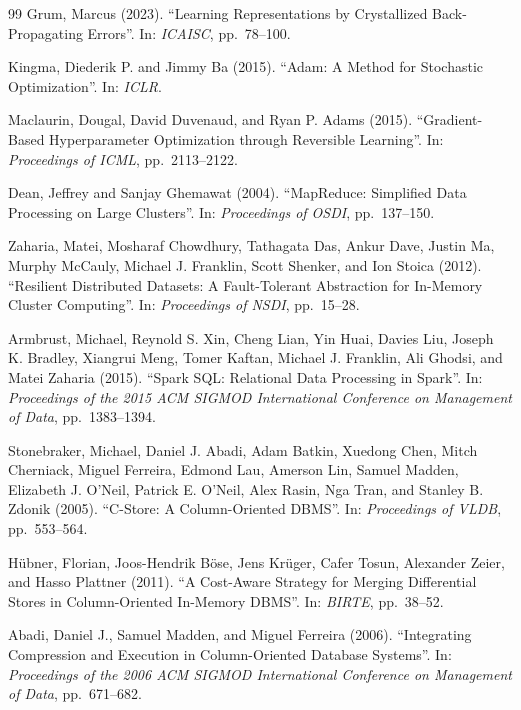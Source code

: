 \documentclass[12pt]{report}
\begin{document}
\begin{thebibliography}{99}
Grum, Marcus (2023).
``Learning Representations by Crystallized Back-Propagating Errors''.
In: \textit{ICAISC},
pp.~78--100.

Kingma, Diederik P. and Jimmy Ba (2015).
``Adam: A Method for Stochastic Optimization''.
In: \textit{ICLR}.

Maclaurin, Dougal, David Duvenaud,
and Ryan P. Adams (2015).
``Gradient-Based Hyperparameter Optimization through Reversible Learning''.
In: \textit{Proceedings of ICML},
pp.~2113--2122.


Dean, Jeffrey and Sanjay Ghemawat (2004).
``MapReduce: Simplified Data Processing on Large Clusters''.
In: \textit{Proceedings of OSDI},
pp.~137--150.

Zaharia, Matei, Mosharaf Chowdhury,
Tathagata Das, Ankur Dave,
Justin Ma, Murphy McCauly,
Michael J. Franklin, Scott Shenker,
and Ion Stoica (2012).
``Resilient Distributed Datasets: A Fault-Tolerant Abstraction for In-Memory Cluster Computing''.
In: \textit{Proceedings of NSDI},
pp.~15--28.


Armbrust, Michael, Reynold S. Xin, Cheng Lian, Yin Huai,
Davies Liu, Joseph K. Bradley, Xiangrui Meng,
Tomer Kaftan, Michael J. Franklin, Ali Ghodsi,
and Matei Zaharia (2015).
``Spark SQL: Relational Data Processing in Spark''.
In: \textit{Proceedings of the 2015 ACM SIGMOD International Conference on Management of Data},
pp.~1383--1394.

Stonebraker, Michael, Daniel J. Abadi,
Adam Batkin, Xuedong Chen,
Mitch Cherniack, Miguel Ferreira,
Edmond Lau, Amerson Lin,
Samuel Madden, Elizabeth J. O'Neil,
Patrick E. O'Neil, Alex Rasin,
Nga Tran, and Stanley B. Zdonik (2005).
``C-Store: A Column-Oriented DBMS''.
In: \textit{Proceedings of VLDB},
pp.~553--564.

H{\"u}bner, Florian, Joos-Hendrik B{\"o}se,
Jens Kr{\"u}ger, Cafer Tosun,
Alexander Zeier, and Hasso Plattner (2011).
``A Cost-Aware Strategy for Merging Differential Stores in Column-Oriented In-Memory DBMS''.
In: \textit{BIRTE},
pp.~38--52.


Abadi, Daniel J., Samuel Madden,
and Miguel Ferreira (2006).
``Integrating Compression and Execution in Column-Oriented Database Systems''.
In: \textit{Proceedings of the 2006 ACM SIGMOD International Conference on Management of Data},
pp.~671--682.



\end{thebibliography}
\end{document}

